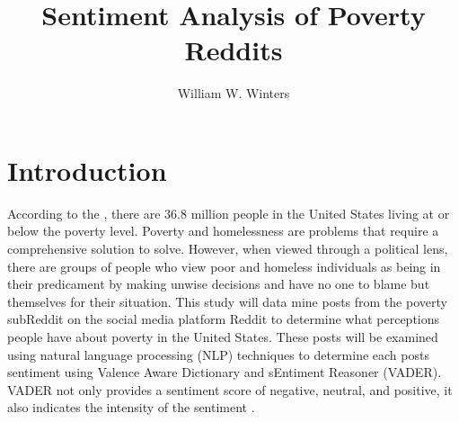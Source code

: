\documentclass[stu,12pt,floatsintext]{apa7}
\title{Sentiment Analysis of Poverty Reddits}
\author{William W. Winters}
\begin{document}
\maketitle

\section{Introduction}
\indent According to the \citet{uscensus2025}, there are 36.8 million people in the United States living at or below the poverty level.  Poverty and homelessness are problems that require a comprehensive solution to solve.  However, when viewed through a political lens, there are groups of people who view poor and homeless individuals as being in their predicament by making unwise decisions and have no one to blame but themselves for their situation.  This study will data mine posts from the poverty subReddit on the social media platform Reddit to determine what perceptions people have about poverty in the United States.  These posts will be examined using natural language processing (NLP) techniques to determine each posts sentiment using Valence Aware Dictionary and sEntiment Reasoner (VADER).  VADER not only provides a sentiment score of negative, neutral, and positive, it also indicates the intensity of the sentiment \citep{nltk2024}.
\end{document}
